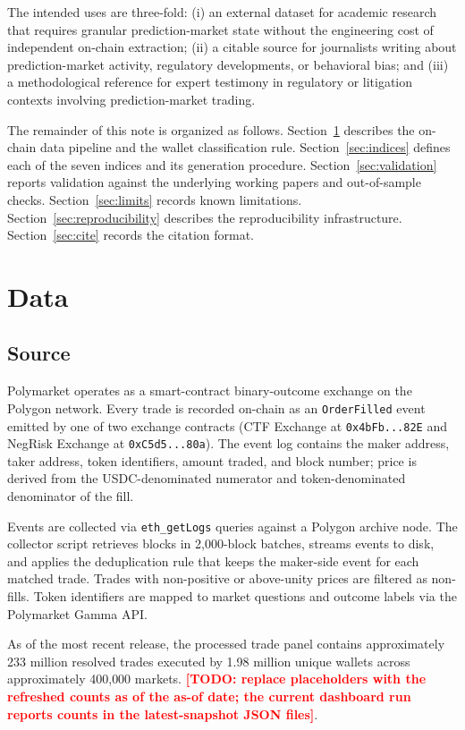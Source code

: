 \documentclass[11pt,letterpaper]{article}
\newcommand{\TODO}[1]{\textcolor{red}{\textbf{[TODO: #1]}}}
\begin{document}
The intended uses are three-fold: (i) an external dataset for academic research that requires granular prediction-market state without the engineering cost of independent on-chain extraction; (ii) a citable source for journalists writing about prediction-market activity, regulatory developments, or behavioral bias; and (iii) a methodological reference for expert testimony in regulatory or litigation contexts involving prediction-market trading.

The remainder of this note is organized as follows. Section~\ref{sec:data} describes the on-chain data pipeline and the wallet classification rule. Section~\ref{sec:indices} defines each of the seven indices and its generation procedure. Section~\ref{sec:validation} reports validation against the underlying working papers and out-of-sample checks. Section~\ref{sec:limits} records known limitations. Section~\ref{sec:reproducibility} describes the reproducibility infrastructure. Section~\ref{sec:cite} records the citation format.

\section{Data}
\label{sec:data}

\subsection{Source}
Polymarket operates as a smart-contract binary-outcome exchange on the Polygon network. Every trade is recorded on-chain as an \texttt{OrderFilled} event emitted by one of two exchange contracts (CTF Exchange at \texttt{0x4bFb...82E} and NegRisk Exchange at \texttt{0xC5d5...80a}). The event log contains the maker address, taker address, token identifiers, amount traded, and block number; price is derived from the USDC-denominated numerator and token-denominated denominator of the fill.

Events are collected via \texttt{eth\_getLogs} queries against a Polygon archive node. The collector script retrieves blocks in 2{,}000-block batches, streams events to disk, and applies the \citet{paradigm2023orderfilled} deduplication rule that keeps the maker-side event for each matched trade. Trades with non-positive or above-unity prices are filtered as non-fills. Token identifiers are mapped to market questions and outcome labels via the Polymarket Gamma API.

As of the most recent release, the processed trade panel contains approximately 233 million resolved trades executed by 1.98 million unique wallets across approximately 400{,}000 markets. \TODO{replace placeholders with the refreshed counts as of the as-of date; the current dashboard run reports counts in the latest-snapshot JSON files}.
\end{document}

